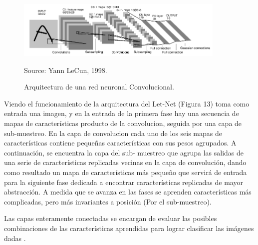 \begin{figure}[H]
		\centering
		\includegraphics[width=100mm]{./Imagenes/arquitectura_CNN_Lecun.png}
		\caption{Arquitectura de una red neuronal Convolucional.}
		Source: Yann LeCun, 1998.
		\label{fig:arquitectura_CNN_Lecun}
\end{figure}

Viendo el funcionamiento de la arquitectura del Let-Net (Figura 13) toma como
entrada una imagen, y en la entrada de la primera fase hay una secuencia de mapas de
características producto de la convolucion, seguida por una capa de sub-muestreo. En la
capa de convolucion cada uno de los seis mapas de características contiene pequeñas
características con sus pesos agrupados. A continuación, se encuentra la capa del sub-
muestreo que agrupa las salidas de una serie de características replicadas vecinas en la
capa de convolución, dando como resultado un mapa de características más pequeño que
servirá de entrada para la siguiente fase dedicada a encontrar características replicadas de
mayor abstracción. A medida que se avanza en las fases se aprenden características más
complicadas, pero más invariantes a posición (Por el sub-muestreo).

Las capas enteramente conectadas se encargan de evaluar las posibles
combinaciones de las características aprendidas para lograr clasificar las imágenes dadas
\cite{16pusiol2014redes}.

